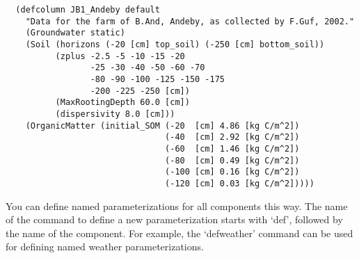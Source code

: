 \begin{verbatim}
  (defcolumn JB1_Andeby default
    "Data for the farm of B.And, Andeby, as collected by F.Guf, 2002."
    (Groundwater static)
    (Soil (horizons (-20 [cm] top_soil) (-250 [cm] bottom_soil))
          (zplus -2.5 -5 -10 -15 -20
                 -25 -30 -40 -50 -60 -70
                 -80 -90 -100 -125 -150 -175
                 -200 -225 -250 [cm])
          (MaxRootingDepth 60.0 [cm])
          (dispersivity 8.0 [cm]))
    (OrganicMatter (initial_SOM (-20  [cm] 4.86 [kg C/m^2])
                                (-40  [cm] 2.92 [kg C/m^2])
                                (-60  [cm] 1.46 [kg C/m^2])
                                (-80  [cm] 0.49 [kg C/m^2])
                                (-100 [cm] 0.16 [kg C/m^2])
                                (-120 [cm] 0.03 [kg C/m^2]))))
\end{verbatim}

You can define named parameterizations for all components this way.
The name of the command to define a new parameterization starts with
`def', followed by the name of the component.  For example, the
`defweather' command can be used for defining named weather
parameterizations.

